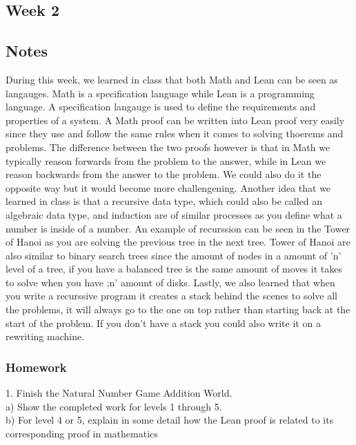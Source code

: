 \documentclass{article}
\theoremstyle{theorem}
\theoremstyle{definition}
\theoremstyle{remark}
\begin{document}
\subsection{Week 2}

\subsection*{Notes}

During this week, we learned in class that both Math and Lean can be seen as langauges. Math is a specification language while Lean is a programming language. A
specification langauge is used to define the requirements and properties of a system. A Math proof can be written into Lean proof very easily since they use and
follow the same rules when it comes to solving thoerems and problems. The difference between the two proofs however is that in Math we typically reason forwards
from the problem to the answer, while in Lean we reason backwards from the answer to the problem. We could also do it the opposite way but it would become more
challengening. Another idea that we learned in class is that a recursive data type, which could also be called an algebraic data type, and induction are of 
similar processes as you define what a number is inside of a number. An example of recurssion can be seen in the Tower of Hanoi as you are solving the previous
tree in the next tree. Tower of Hanoi are also similar to binary search trees since the amount of nodes in a amount of 'n' level of a tree, if you have a balanced
tree is the same amount of moves it takes to solve when you have ;n' amount of disks. Lastly, we also learned that when you write a recurssive program it creates 
a stack behind the scenes to solve all the problems, it will always go to the one on top rather than starting back at the start of the problem. If you don't have
a stack you could also write it on a rewriting machine.

\subsubsection*{Homework}

1. Finish the Natural Number Game Addition World. \\
\hspace*{2em}a) Show the completed work for levels 1 through 5. \\
\hspace*{2em}b) For level 4 or 5, explain in some detail how the Lean proof is related to its corresponding proof in mathematics \\
\end{document}
